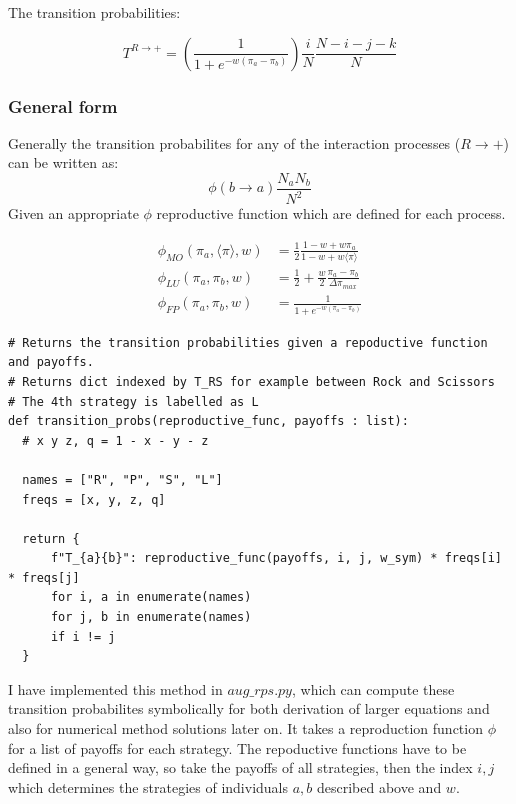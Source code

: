 \documentclass{article}
\begin{document}
The transition probabilities:

\begin{equation}
T^{R \rightarrow +} = \left( \frac{1}{1 + e^{-w(\pi_a - \pi_b)}}\right) \frac{i}{N} \frac{N-i-j-k}{N}
\end{equation}


\subsubsection{General form}
Generally the transition probabilites for any of the 
interaction processes ($R \rightarrow +$) can be written as:
\begin{equation}
  \phi(b \rightarrow a) \frac{N_a N_b}{N^2}
\end{equation}
Given an appropriate $\phi$ reproductive function which are defined for each process.

\begin{align}
\phi_{MO}(\pi_a, \langle \pi \rangle, w) &= \frac{1}{2} \frac{1 - w + w \pi_a}{1 - w + w \langle \pi \rangle} \\
\phi_{LU}(\pi_a, \pi_b, w) &= \frac{1}{2} +  \frac{w}{2} \frac{\pi_a - \pi_b}{\Delta \pi_{max}} \\
\phi_{FP}(\pi_a, \pi_b, w) &= \frac{1}{1 + e^{-w(\pi_a - \pi_b)}}
\end{align}

\begin{verbatim}
# Returns the transition probabilities given a repoductive function and payoffs.
# Returns dict indexed by T_RS for example between Rock and Scissors
# The 4th strategy is labelled as L
def transition_probs(reproductive_func, payoffs : list):
  # x y z, q = 1 - x - y - z

  names = ["R", "P", "S", "L"]
  freqs = [x, y, z, q]

  return {
      f"T_{a}{b}": reproductive_func(payoffs, i, j, w_sym) * freqs[i] * freqs[j]
      for i, a in enumerate(names)
      for j, b in enumerate(names)
      if i != j
  }
\end{verbatim}
I have implemented this method in $aug\_rps.py$, which can
compute these transition probabilites symbolically for 
both derivation of larger equations and also for numerical 
method solutions later on. It takes a reproduction function $\phi$
for a list of payoffs for each strategy.
The repoductive functions have to be defined in a general way,
so take the payoffs of all strategies, then the index $i,j$
which determines the strategies of individuals $a,b$ described above
and $w$.
\end{document}
